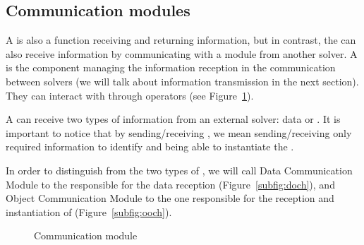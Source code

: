 \subsection{Communication modules}


A \opch{} is also a function receiving and returning information, but in contrast, the \opch{} can also receive information by communicating with a module from another solver. A \opch{} is the component managing the information reception in the communication between solvers (we will talk about information transmission in the next section). They can interact with \oms{} through operators (see Figure~\ref{fig:och}).

A \opch{} can receive two types of information from an external solver: data or \oms{}. It is important to notice that by sending/receiving \oms, we mean sending/receiving only required information to identify and being able to instantiate the \om.

In order to distinguish from the two types of \opchs, we will call Data Communication Module to the \opch{} responsible for the data reception (Figure~\ref{subfig:doch}), and Object Communication Module to the one responsible for the reception and instantiation of \oms{} (Figure~\ref{subfig:ooch}).


%

\begin{figure}
	\centering
	\hspace{0.05\textwidth}%
	\caption[]{Communication module}
	\label{fig:och}
\end{figure}

